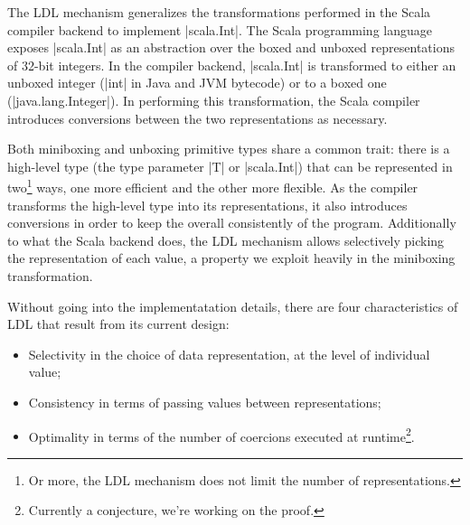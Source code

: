 The LDL mechanism generalizes the transformations performed in the Scala compiler backend to implement |scala.Int|. The Scala programming language exposes |scala.Int| as an abstraction over the boxed and unboxed representations of 32-bit integers. In the compiler backend, |scala.Int| is transformed to either an unboxed integer (|int| in Java and JVM bytecode) or to a boxed one (|java.lang.Integer|). In performing this transformation, the Scala compiler introduces conversions between the two representations as necessary. %


Both miniboxing and unboxing primitive types share a common trait: there is a high-level type (the type parameter |T| or |scala.Int|) that can be represented in two\footnote{Or more, the LDL mechanism does not limit the number of representations.} ways, one more efficient and the other more flexible. As the compiler transforms the high-level type into its representations, it also introduces conversions in order to keep the overall consistently of the program. Additionally to what the Scala backend does, the LDL mechanism allows selectively picking the representation of each value, a property we exploit heavily in the miniboxing transformation.

Without going into the implementatation details, there are four characteristics of LDL that result from its current design:

\begin{itemize}
  \item Selectivity in the choice of data representation, at the level of individual value;
  \item Consistency in terms of passing values between representations; %
  \item Optimality in terms of the number of coercions executed at runtime\footnote{Currently a conjecture, we're working on the proof.}.
\end{itemize}

